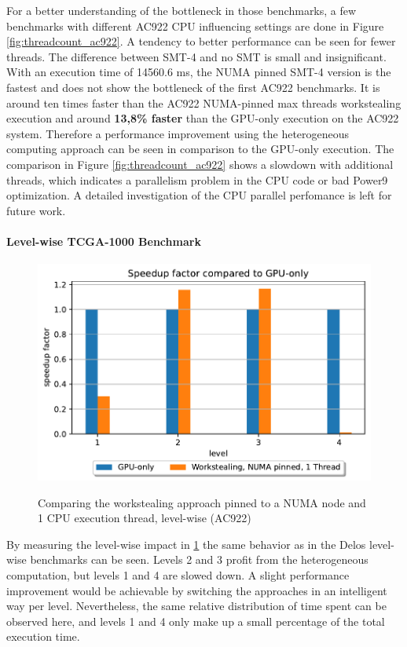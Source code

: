 For a better understanding of the bottleneck in those benchmarks, a few benchmarks with different AC922 CPU influencing settings are done in Figure \ref{fig:threadcount_ac922}. A tendency to better performance can be seen for fewer threads. The difference between SMT-4 and no SMT is small and insignificant. With an execution time of 14560.6 ms, the NUMA pinned SMT-4 version is the fastest and does not show the bottleneck of the first AC922 benchmarks. It is around ten times faster than the AC922 NUMA-pinned max threads workstealing execution and around \textbf{13,8\% faster} than the GPU-only execution on the AC922 system. Therefore a performance improvement using the heterogeneous computing approach can be seen in comparison to the GPU-only execution. The comparison in Figure \ref{fig:threadcount_ac922} shows a slowdown with additional threads, which indicates a parallelism problem in the CPU code or bad Power9 optimization. A detailed investigation of the CPU parallel perfomance is left for future work.

\paragraph{Level-wise TCGA-1000 Benchmark}
\begin{figure}[H]
  \caption{Comparing the workstealing approach pinned to a NUMA node and 1 CPU execution thread, level-wise (AC922)}
  \includegraphics[width=\textwidth]{figures/ac922_levelwise.pdf}
  \centering
  \label{fig:levelwise_ac922}
\end{figure}

By measuring the level-wise impact in \ref{fig:levelwise_ac922} the same behavior as in the Delos level-wise benchmarks can be seen. Levels 2 and 3 profit from the heterogeneous computation, but levels 1 and 4 are slowed down. A slight performance improvement would be achievable by switching the approaches in an intelligent way per level. Nevertheless, the same relative distribution of time spent can be observed here, and levels 1 and 4 only make up a small percentage of the total execution time.

